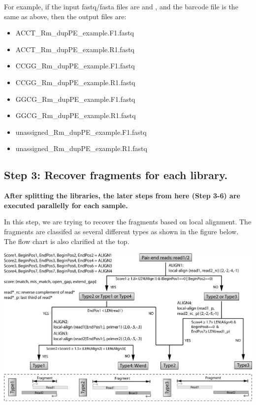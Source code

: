 \documentclass[letterpaper,10pt,english]{sphinxmanual}
\begin{document}
For example, if the input fastq/fasta files are  and , and the barcode file is the same as above, then the output files are:
\begin{itemize}
\item {} 
ACCT\_Rm\_dupPE\_example.F1.fastq

\item {} 
ACCT\_Rm\_dupPE\_example.R1.fastq

\item {} 
CCGG\_Rm\_dupPE\_example.F1.fastq

\item {} 
CCGG\_Rm\_dupPE\_example.R1.fastq

\item {} 
GGCG\_Rm\_dupPE\_example.F1.fastq

\item {} 
GGCG\_Rm\_dupPE\_example.R1.fastq

\item {} 
unassigned\_Rm\_dupPE\_example.F1.fastq

\item {} 
unassigned\_Rm\_dupPE\_example.R1.fastq

\end{itemize}


\subsection{Step 3: Recover fragments for each library.}
\label{Analysis_pipeline:step-3-recover-fragments-for-each-library}\label{Analysis_pipeline:step3}
\textbf{After splitting the libraries, the later steps from here (Step 3-6) are executed parallelly for each sample.}

In this step, we are trying to recover the fragments based on local alignment. The fragments are classifed as several different types as shown in the figure below. The flow chart is also clarified at the top.

{\hfill\includegraphics{workflow_for_recoverFragment.jpg}\hfill}
\end{document}
